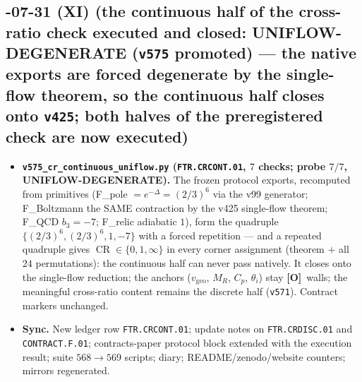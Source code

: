 \documentclass[11pt]{article}
\providecommand{\mO}{\textbf{[O]}}\providecommand{\mX}{\textbf{[X]}}
\begin{document}
\subsection*{-07-31 (XI) (the continuous half of the cross-ratio check executed and closed: UNIFLOW-DEGENERATE (\texttt{v575} promoted) --- the native exports are forced degenerate by the single-flow theorem, so the continuous half closes onto \texttt{v425}; both halves of the preregistered check are now executed)}
\begin{itemize}[leftmargin=1.5em]
\item \textbf{\texttt{v575\_cr\_continuous\_uniflow.py} (\texttt{FTR.CRCONT.01}, $7$ checks;
probe $7/7$, UNIFLOW-DEGENERATE).} The frozen protocol exports, recomputed from primitives
(F\_pole $=e^{-\Delta}=(2/3)^6$ via the v99 generator; F\_Boltzmann the SAME contraction by
the v425 single-flow theorem; F\_QCD $b_3=-7$; F\_relic adiabatic $1$), form the quadruple
$\{(2/3)^6,(2/3)^6,1,-7\}$ with a forced repetition --- and a repeated quadruple gives
$\operatorname{CR}\in\{0,1,\infty\}$ in every corner assignment (theorem $+$ all $24$
permutations): the continuous half can never pass natively.  It closes onto the single-flow
reduction; the anchors ($v_{\mathrm{geo}}$, $M_R$, $C_p$, $\theta_i$) stay \mO\ walls; the
meaningful cross-ratio content remains the discrete half (\texttt{v571}).  Contract markers
unchanged.
\item \textbf{Sync.} New ledger row \texttt{FTR.CRCONT.01}; update notes on
\texttt{FTR.CRDISC.01} and \texttt{CONTRACT.F.01}; contracts-paper protocol block extended
with the execution result; suite $568\to569$ scripts; diary; README/zenodo/website counters;
mirrors regenerated.
\end{itemize}
\end{document}
